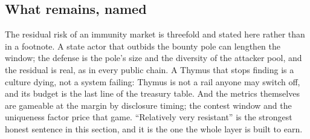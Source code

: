 \subsection{What remains, named}

The residual risk of an immunity market is threefold and
stated here rather than in a footnote. A state actor that
outbids the bounty pole can lengthen the window; the defense is
the pole's size and the diversity of the attacker pool, and the
residual is real, as in every public chain. A Thymus that stops
finding is a culture dying, not a system failing: Thymus is not
a rail anyone may switch off, and its budget is the last line of
the treasury table. And the metrics themselves are gameable at
the margin by disclosure timing; the contest window and the
uniqueness factor price that game. ``Relatively very
resistant'' is the strongest honest sentence in this section,
and it is the one the whole layer is built to earn.
